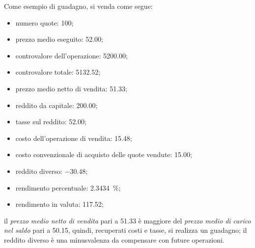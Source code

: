 \documentclass[12pt,a4paper]{article}
\newcommand{\Eur}[1]{\SI{#1}{\text{\euro{}}}}
\begin{document}

Come esempio di guadagno, si venda come segue:
\begin{itemize}
\item numero quote: \num{100};
\item prezzo medio eseguito: \Eur{52,00};
\item controvalore dell'operazione: \Eur{5200,00};
\item controvalore totale: \Eur{5132,52};
\item prezzo medio netto di vendita: \Eur{51,33};

\item reddito da capitale: \Eur{200,00};
\item tasse sul reddito: \Eur{52,00};
\item costo dell'operazione di vendita: \Eur{15,48};
\item costo convenzionale di acquisto delle quote vendute: \Eur{15,00};
\item reddito diverso: \Eur{-30,48};

\item rendimento percentuale: \SI{2,3434}{\percent};
\item rendimento in valuta: \Eur{117,52};
\end{itemize}
il \emph{prezzo  medio netto di  vendita} pari  a \Eur{51,33} è  maggiore del \emph{prezzo  medio di
   carico nel saldo} pari a \Eur{50,15}, quindi,  recuperati costi e tasse, si realizza un guadagno;
il reddito diverso è una minusvalenza da compensare con future operazioni.

\end{document}
